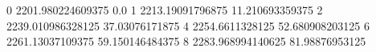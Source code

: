 0 2201.980224609375 0.0
1 2213.19091796875 11.210693359375
2 2239.010986328125 37.03076171875
4 2254.6611328125 52.680908203125
6 2261.13037109375 59.150146484375
8 2283.968994140625 81.98876953125
